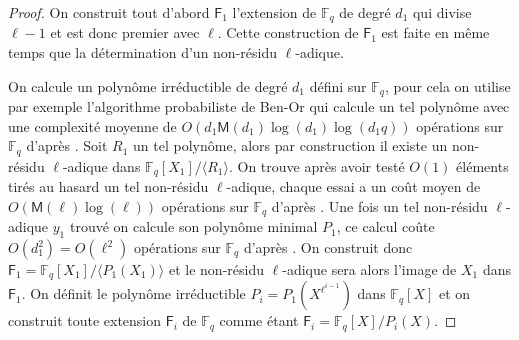 \documentclass[10pt,a4paper]{book}
\theoremstyle{plain}
\theoremstyle{definition}
\theoremstyle{definition}
\theoremstyle{definition}
\theoremstyle{definition}
\theoremstyle{definition}
\theoremstyle{remark}
\newtheorem{rem}[thm]{Remarque}
\theoremstyle{remark}
\theoremstyle{definition}
\begin{document}
 \begin{proof}
  On construit tout d'abord $\mathsf{F}_1$ l'extension de $\mathbb{F}_q$ de degré $d_1$ qui divise $\ell-1$ et est donc premier avec $\ell$. Cette construction de $\mathsf{F}_1$ est faite en même temps que la détermination d'un non-résidu $\ell$-adique. 

On calcule un polynôme irréductible de degré $d_1$ défini sur $\mathbb{F}_q$, pour cela on utilise par exemple l'algorithme probabiliste de Ben-Or qui calcule un tel polynôme avec une complexité moyenne de $O(d_1\mathsf{M}(d_1)\log(d_1)\log(d_1q))$ opérations sur $\mathbb{F}_q$ d'après \cite[Theorem 14.42]{vzGJG03}.
 Soit $R_1$ un tel polynôme, alors par construction il existe un non-résidu $\ell$-adique dans $\mathbb{F}_q[X_1]/ \langle R_1 \rangle $. On trouve après avoir testé $O(1)$ éléments tirés au hasard un tel non-résidu $\ell$-adique, chaque essai a un coût moyen de $O(\mathsf{M}(\ell)\log(\ell))$ opérations sur $\mathbb{F}_q$ d'après \cite[11.1]{vzGJG03}. Une fois un tel non-résidu $\ell$-adique $y_1$ trouvé on calcule son polynôme minimal $P_1$, ce calcul coûte $O(d_1^2)=O(\ell^2)$ opérations sur $\mathbb{F}_q$ d'après \cite[Th. 3.4]{Shoup93}. On construit donc $\mathsf{F}_1=\mathbb{F}_q[X_1]/\langle P_1(X_1) \rangle$ et le non-résidu $\ell$-adique sera alors l'image de $X_1$ dans $\mathsf{F}_1$. On définit le polynôme irréductible $P_i=P_1(X^{\ell^{i-1}})$ dans $\mathbb{F}_q[X]$ et on construit toute extension $\mathsf{F}_{i}$ de $\mathbb{F}_{q}$ comme étant $\mathsf{F}_{i}=\mathbb{F}_q[X]/P_i(X)$. 
 
\end{proof}

\end{document}
